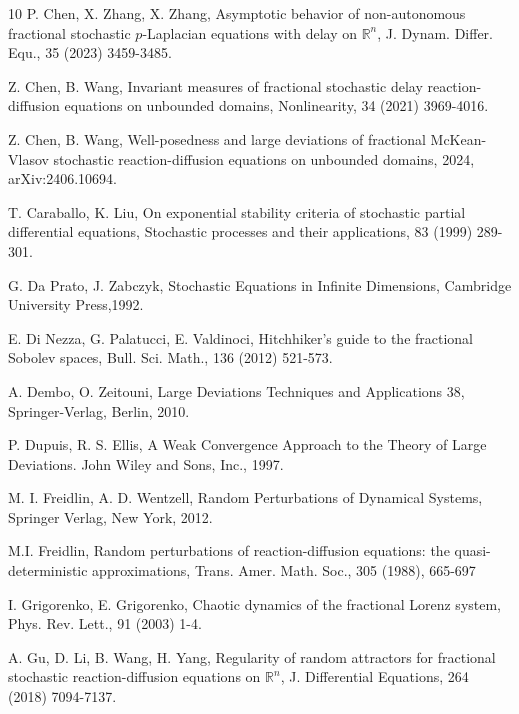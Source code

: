 \documentclass[11pt]{article}
\numberwithin{equation}{section}
\begin{document}
\begin{thebibliography}{10}
P. Chen, X. Zhang, X. Zhang, Asymptotic behavior of non-autonomous fractional stochastic $p$-Laplacian equations with delay on $\mathbb{R}^n$, J. Dynam. Differ. Equ., 35 (2023) 3459-3485.

Z. Chen, B. Wang, Invariant measures of fractional stochastic
delay reaction-diffusion equations on
unbounded domains, Nonlinearity, 34 (2021) 3969-4016.



Z. Chen, B. Wang, Well-posedness and large deviations of fractional McKean-Vlasov stochastic reaction-diffusion equations on unbounded domains, 2024,	arXiv:2406.10694.



T. Caraballo, K. Liu, On exponential stability criteria of stochastic partial differential equations, Stochastic processes and their applications, 83 (1999) 289-301.




 G. Da Prato, J. Zabczyk, Stochastic Equations in Infinite Dimensions, Cambridge University Press,1992.








 E. Di Nezza, G. Palatucci, E. Valdinoci,
Hitchhiker's guide to the fractional Sobolev spaces,
Bull. Sci. Math., 136 (2012) 521-573.



A. Dembo, O. Zeitouni, Large Deviations Techniques and Applications 38, Springer-Verlag,
Berlin, 2010.



P. Dupuis, R. S. Ellis, A Weak Convergence Approach to the Theory of
Large Deviations. John Wiley and Sons, Inc., 1997.


M. I. Freidlin, A. D. Wentzell, Random Perturbations of Dynamical Systems, Springer Verlag, New York, 2012.

M.I. Freidlin, Random perturbations of reaction-diffusion equations: the quasi-deterministic
approximations, Trans. Amer. Math. Soc., 305 (1988), 665-697



I. Grigorenko, E. Grigorenko, Chaotic dynamics of the fractional Lorenz system, Phys. Rev. Lett.,
91 (2003) 1-4.


A. Gu, D. Li, B. Wang, H. Yang,
Regularity of random attractors for fractional stochastic
reaction-diffusion equations on $\mathbb{R}^n$,
 J. Differential Equations, 264 (2018) 7094-7137.


\end{thebibliography}
\end{document}
